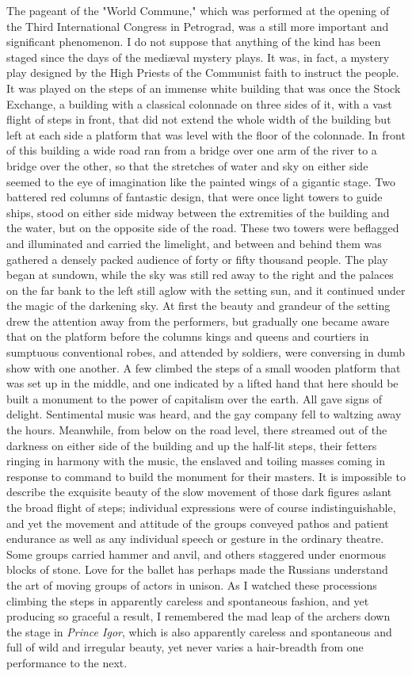 The pageant of the "World Commune," which was performed at the opening of the Third International Congress in Petrograd, was a still more important and significant phenomenon. I do not suppose that anything of the kind has been staged since the days of the mediæval mystery plays. It was, in fact, a mystery play designed by the High Priests of the Communist faith to instruct the people. It was played on the steps of an immense white building that was once the Stock Exchange, a building with a classical colonnade on three sides of it, with a vast flight of steps in front, that did not extend the whole width of the building but left at each side a platform that was level with the floor of the colonnade. In front of this building a wide road ran from a bridge over one arm of the river to a bridge over the other, so that the stretches of water and sky on either side seemed to the eye of imagination like the painted wings of a gigantic stage. Two battered red columns of fantastic design, that were once light towers to guide ships, stood on either side midway between the extremities of the building and the water, but on the opposite side of the road. These two towers were beflagged and illuminated and carried the limelight, and between and behind them was gathered a densely packed audience of forty or fifty thousand people. The play began at sundown, while the sky was still red away to the right and the palaces on the far bank to the left still aglow with the setting sun, and it continued under the magic of the darkening sky. At first the beauty and grandeur of the setting drew the attention away from the performers, but gradually one became aware that on the platform before the columns kings and queens and courtiers in sumptuous conventional robes, and attended by soldiers, were conversing in dumb show with one another. A few climbed the steps of a small wooden platform that was set up in the middle, and one indicated by a lifted hand that here should be built a monument to the power of capitalism over the earth. All gave signs of delight. Sentimental music was heard, and the gay company fell to waltzing away the hours. Meanwhile, from below on the road level, there streamed out of the darkness on either side of the building and up the half-lit steps, their fetters ringing in harmony with the music, the enslaved and toiling masses coming in response to command to build the monument for their masters. It is impossible to describe the exquisite beauty of the slow movement of those dark figures aslant the broad flight of steps; individual expressions were of course indistinguishable, and yet the movement and attitude of the groups conveyed pathos and patient endurance as well as any individual speech or gesture in the ordinary theatre. Some groups carried hammer and anvil, and others staggered under enormous blocks of stone. Love for the ballet has perhaps made the Russians understand the art of moving groups of actors in unison. As I watched these processions climbing the steps in apparently careless and spontaneous fashion, and yet producing so graceful a result, I remembered the mad leap of the archers down the stage in \emph{Prince Igor}, which is also apparently careless and spontaneous and full of wild and irregular beauty, yet never varies a hair-breadth from one performance to the next.

